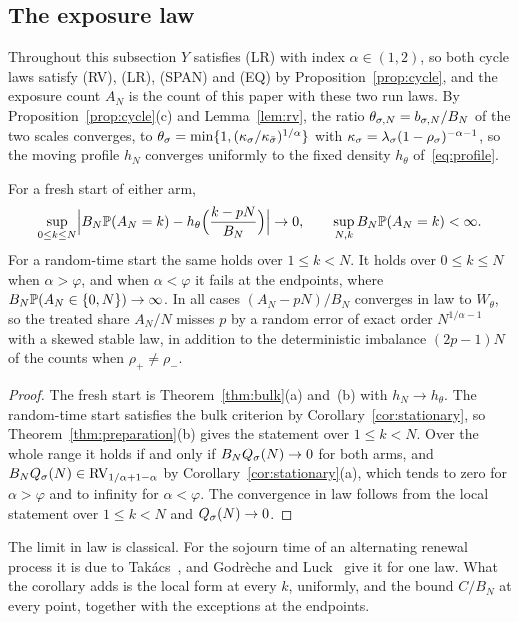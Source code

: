 \subsection{The exposure law}\label{sec:exposure-law}

Throughout this subsection $Y$ satisfies (LR) with index $\alpha\in(1,2)$, so both cycle laws
satisfy (RV), (LR), (SPAN) and (EQ) by Proposition~\ref{prop:cycle}, and the exposure count
$A_N$ is the count of this paper with these two run laws. By Proposition~\ref{prop:cycle}(c)
and Lemma~\ref{lem:rv}, the ratio $\theta_{\sigma,N}=b_{\sigma,N}/B_N$ of the two scales converges,
to $\theta_\sigma=\min\{1,(\kappa_\sigma/\kappa_{\bar\sigma})^{1/\alpha}\}$ with
$\kappa_\sigma=\lambda_\sigma(1-\rho_\sigma)^{-\alpha-1}$, so the moving profile $h_N$ converges
uniformly to the fixed density $h_\theta$ of~\eqref{eq:profile}.

\begin{corollary}\label{cor:exposure-bulk}
For a fresh start of either arm,
\[
 \sup_{0\le k\le N}\Bigl|B_N\mathbb{P}(A_N=k)-h_\theta\Bigl(\frac{k-pN}{B_N}\Bigr)\Bigr|\to0,\qquad
 \sup_{N,k}B_N\mathbb{P}(A_N=k)<\infty .
\]
For a random-time start the same holds over $1\le k<N$. It holds over $0\le k\le N$ when
$\alpha>\varphi$, and when $\alpha<\varphi$ it fails at the endpoints, where
$B_N\mathbb{P}(A_N\in\{0,N\})\to\infty$. In all cases $(A_N-pN)/B_N$ converges in law to
$W_\theta$, so the treated share $A_N/N$ misses $p$ by a random error of exact order
$N^{1/\alpha-1}$ with a skewed stable law, in addition to the deterministic imbalance
$(2p-1)N$ of the counts when $\rho_\plus\ne\rho_\minus$.
\end{corollary}

\begin{proof}
The fresh start is Theorem~\ref{thm:bulk}(a) and~(b) with $h_N\to h_\theta$. The random-time
start satisfies the bulk criterion by Corollary~\ref{cor:stationary}, so
Theorem~\ref{thm:preparation}(b) gives the statement over $1\le k<N$. Over the whole range it
holds if and only if $B_NQ_\sigma(N)\to0$ for both arms, and
$B_NQ_\sigma(N)\in\mathrm{RV}_{1/\alpha+1-\alpha}$ by Corollary~\ref{cor:stationary}(a), which tends to
zero for $\alpha>\varphi$ and to infinity for $\alpha<\varphi$. The convergence in law follows
from the local statement over $1\le k<N$ and $Q_\sigma(N)\to0$.
\end{proof}

The limit in law is classical. For the sojourn time of an alternating renewal process it is
due to Tak\'acs~\cite{takacs1957}, and Godr\`eche and Luck~\cite{godrecheluck2001} give it for
one law. What the corollary adds is the local form at every $k$, uniformly, and the bound
$C/B_N$ at every point, together with the exceptions at the endpoints.

